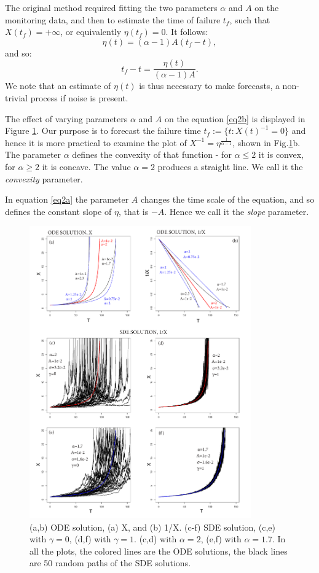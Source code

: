\documentclass{article}
\begin{document}
The original method required fitting the two parameters $\alpha$ and $A$ on the monitoring data, and then to estimate the time of failure $t_f$, such that $X(t_f) =+\infty$, or equivalently $\eta(t_f)=0$. It follows:
$$\eta(t)=(\alpha-1)A(t_f-t),$$
and so:
$$t_f-t=\frac{\eta(t)}{(\alpha-1)A}.$$
We note that an estimate of $\eta(t)$ is thus necessary to make forecasts, a non-trivial process if noise is present.

The effect of varying parameters $\alpha$ and $A$ on the equation \ref{eq2b} is displayed in Figure \ref{Fig1}. Our purpose is to forecast the failure time $t_f:=\{t:X(t)^{-1}=0\}$ and hence it is more practical to examine the plot of $X^{-1}=\eta^{\frac{1}{\alpha-1}}$, shown in Fig.\ref{Fig1}b. The parameter $\alpha$ defines the convexity of that function - for $\alpha\le2$ it is convex, for $\alpha\ge2$ it is concave. The value $\alpha=2$ produces a straight line. We call it the {\it convexity} parameter.

In equation \ref{eq2a} the parameter $A$ changes the time scale of the equation, and so defines the constant slope of $\eta$, that is $-A$. Hence we call it the {\it slope} parameter.

\begin{figure}[H]
\centering
\includegraphics[width=0.85\textwidth]{Fig1_plus.png}
\caption{(a,b) ODE solution, (a) X, and (b) 1/X. (c-f) SDE solution, (c,e) with $\gamma=0$, (d,f) with $\gamma=1$. (c,d) with $\alpha=2$, (e,f) with $\alpha=1.7$. In all the plots, the colored lines are the ODE solutions, the black lines are 50 random paths of the SDE solutions.}
\label{Fig1}
\end{figure}
\end{document}
